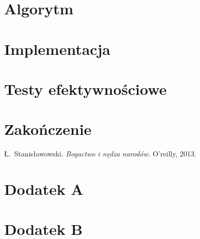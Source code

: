 \documentclass{article}
\begin{document}
\section{Algorytm}

\section{Implementacja}

\section{Testy efektywnościowe}

\section{Zakończenie}

\begin{thebibliography}{}
Ł.~Stanisławowski. \emph{Bogactwo i nędza narodów.}
O'reilly, 2013.
\end{thebibliography}

\appendix

\section{Dodatek A}

\section{Dodatek B}
\end{document}
